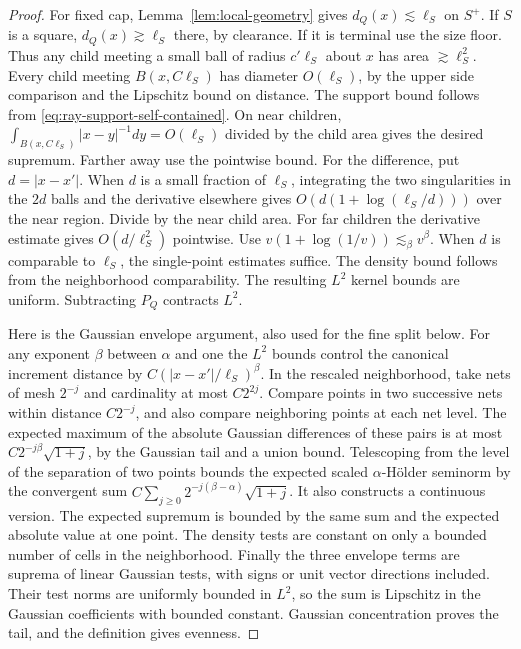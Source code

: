 \documentclass[11pt]{article}
\newcommand{\1}{\mathbf{1}}
\numberwithin{equation}{section}
\begin{document}
\begin{proof}
For fixed cap, Lemma~\ref{lem:local-geometry} gives
\(d_Q(x)\lesssim\ell_S\) on \(S^+\). If \(S\) is a square,
\(d_Q(x)\gtrsim\ell_S\) there, by clearance. If it is terminal
use the size floor. Thus any child meeting a small ball of
radius \(c'\ell_S\) about \(x\) has area \(\gtrsim\ell_S^2\).
Every child meeting \(B(x,C\ell_S)\) has diameter
\(O(\ell_S)\), by the upper side comparison and the Lipschitz
bound on distance. The support bound follows from
\eqref{eq:ray-support-self-contained}. On near children,
\(\int_{B(x,C\ell_S)}|x-y|^{-1}dy=O(\ell_S)\)
divided by the child area gives the desired supremum.
Farther away use the pointwise bound. For the difference, put
\(d=|x-x'|\). When \(d\) is a small fraction of \(\ell_S\),
integrating the two singularities in the \(2d\) balls and the
derivative elsewhere gives \(O(d(1+\log(\ell_S/d)))\) over
the near region. Divide by the near child area. For far
children the derivative estimate gives \(O(d/\ell_S^2)\)
pointwise. Use \(v(1+\log(1/v))\lesssim_\beta v^\beta\).
When \(d\) is comparable to \(\ell_S\), the single-point
estimates suffice. The density bound follows from the
neighborhood comparability. The resulting \(L^2\) kernel
bounds are uniform. Subtracting \(P_Q\) contracts \(L^2\).

Here is the Gaussian envelope argument, also used for the
fine split below. For any exponent \(\beta\) between \(\alpha\)
and one the \(L^2\) bounds control the canonical increment
distance by \(C(|x-x'|/\ell_S)^\beta\). In the rescaled
neighborhood, take nets of mesh \(2^{-j}\) and cardinality
at most \(C2^{2j}\). Compare points in two successive nets
within distance \(C2^{-j}\), and also compare neighboring
points at each net level. The expected maximum of the
absolute Gaussian differences of these pairs is at most
\(C2^{-j\beta}\sqrt{1+j}\), by the Gaussian tail and a union
bound. Telescoping from the level of the separation of two
points bounds the expected scaled \(\alpha\)-H\"older
seminorm by the convergent sum
\(C\sum_{j\ge0}2^{-j(\beta-\alpha)}\sqrt{1+j}\).
It also constructs a continuous version. The expected
supremum is bounded by the same sum and the expected
absolute value at one point. The density tests are constant
on only a bounded number of cells in the neighborhood.
Finally the three envelope terms are suprema of linear
Gaussian tests, with signs or unit vector directions
included. Their test norms are uniformly bounded in
\(L^2\), so the sum is Lipschitz in the Gaussian coefficients
with bounded constant. Gaussian concentration proves the
tail, and the definition gives evenness.
\end{proof}
\end{document}
